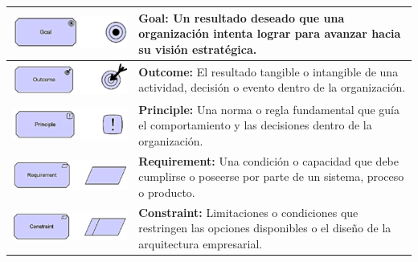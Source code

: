 \begin{longtable}{|c|p{8cm}|}
\hline
\includegraphics{apendices/ARCHI/strategy/goal.png} & 
\textbf{Goal:} Un resultado deseado que una organización intenta lograr para avanzar hacia su visión estratégica. \\
\hline
\includegraphics{apendices/ARCHI/strategy/outcome.png} & 
\textbf{Outcome:} El resultado tangible o intangible de una actividad, decisión o evento dentro de la organización. \\
\hline
\includegraphics{apendices/ARCHI/strategy/principle.png} & 
\textbf{Principle:} Una norma o regla fundamental que guía el comportamiento y las decisiones dentro de la organización. \\
\hline
\includegraphics{apendices/ARCHI/strategy/requirement.png} & 
\textbf{Requirement:} Una condición o capacidad que debe cumplirse o poseerse por parte de un sistema, proceso o producto. \\
\hline
\includegraphics{apendices/ARCHI/strategy/constraint.png} & 
\textbf{Constraint:} Limitaciones o condiciones que restringen las opciones disponibles o el diseño de la arquitectura empresarial. \\

\end{longtable}
